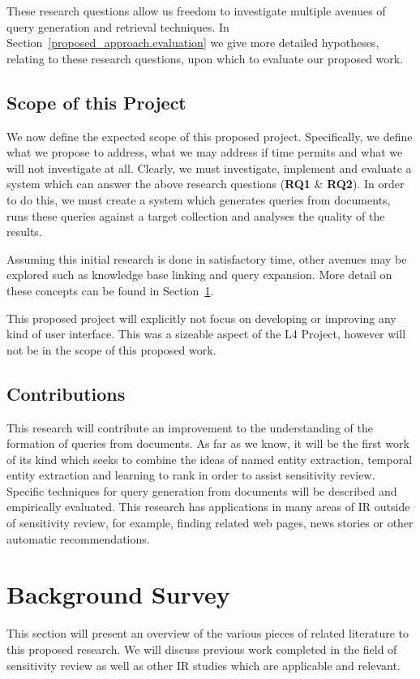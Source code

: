 \documentclass{mprop}
\begin{document}
These research questions allow us freedom to investigate multiple avenues of query generation and retrieval techniques. In Section~\ref{proposed_approach.evaluation} we give more detailed hypotheses, relating to these research questions, upon which to evaluate our proposed work.

\subsection{Scope of this Project}
We now define the expected scope of this proposed project. 
Specifically, we define what we propose to address, what we may address if time permits and what we will not investigate at all.
Clearly, we must investigate, implement and evaluate a system which can answer the above research questions (\textbf{RQ1} \& \textbf{RQ2}). 
In order to do this, we must create a system which generates queries from documents, runs these queries against a target collection and analyses the quality of the results.

Assuming this initial research is done in satisfactory time, other avenues may be explored such as knowledge base linking and query expansion. 
More detail on these concepts can be found in Section~\ref{background_survey}.

This proposed project will explicitly not focus on developing or improving any kind of user interface. 
This was a sizeable aspect of the L4 Project, however will not be in the scope of this proposed work.

\subsection{Contributions}
This research will contribute an improvement to the understanding of the formation of queries from documents. 
As far as we know, it will be the first work of its kind which seeks to combine the ideas of named entity extraction, temporal entity extraction and learning to rank in order to assist sensitivity review.
Specific techniques for query generation from documents will be described and empirically evaluated. 
This research has applications in many areas of IR outside of sensitivity review, for example, finding related web pages, news stories or other automatic recommendations.

\section{Background Survey} \label{background_survey}
This section will present an overview of the various pieces of related literature to this proposed research. 
We will discuss previous work completed in the field of sensitivity review as well as other IR studies which are applicable and relevant.
\end{document}
